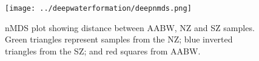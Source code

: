 \begin{figure}
  \centering
  \texttt{[image: ../deepwaterformation/deepnmds.png]}
  \caption[\ac{nMDS} of \ac{AABW}, \ac{NZ} and \ac{SZ} samples]{\ac{nMDS} plot showing distance between \ac{AABW}, \ac{NZ} and \ac{SZ} samples.
  Green triangles represent samples from the \ac{NZ}; blue inverted triangles from the \ac{SZ}; and red squares from \ac{AABW}.}
  \label{fig:deepnmds}
\end{figure}

